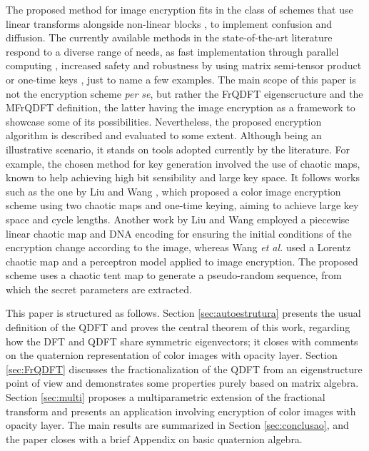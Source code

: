 The proposed method for image encryption fits in the class of schemes that use linear transforms alongside non-linear blocks \cite{hsue2018enhancing}, to implement confusion and diffusion. The currently available methods in the state-of-the-art literature respond to a diverse range of needs, as fast implementation through parallel computing \cite{wang2019fast}, increased safety and robustness by using matrix semi-tensor product \cite{wang2020image} or one-time keys \cite{liu2010}, just to name a few examples. The main scope of this paper is not the encryption scheme \textit{per se}, but rather the FrQDFT eigenscructure and the MFrQDFT definition, the latter having the image encryption as a framework to showcase some of its possibilities. Nevertheless, the proposed encryption algorithm is described and evaluated to some extent. Although being an illustrative scenario, it stands on tools adopted currently by the literature. For example, the chosen method for key generation involved the use of chaotic maps, known to help achieving high bit sensibility and large key space. It follows works such as the one by Liu and Wang \cite{liu2011color}, which proposed a color image encryption scheme using two chaotic maps and one-time keying, aiming to achieve large key space and cycle lengths. Another work by Liu and Wang \cite{liu2012} employed a piecewise linear chaotic map and DNA encoding for ensuring the initial conditions of the encryption change according to the image, whereas Wang \textit{et al.} \cite{wang2010chaotic} used a Lorentz chaotic map and a perceptron model applied to image encryption. The proposed scheme uses a chaotic tent map to generate a pseudo-random sequence, from which the secret parameters are extracted.


This paper is structured as follows. Section \ref{sec:autoestrutura} presents the usual definition of the QDFT and proves the central theorem of this work, regarding how the DFT and QDFT share symmetric eigenvectors; it closes with comments on the quaternion representation of color images with opacity layer. Section \ref{sec:FrQDFT} discusses the fractionalization of the QDFT from an eigenstructure point of view and demonstrates some properties purely based on matrix algebra. Section \ref{sec:multi} proposes a multiparametric extension of the fractional transform and presents an application involving encryption of color images with opacity layer. The main results are summarized in Section \ref{sec:conclusao}, and the paper closes with a brief Appendix on basic quaternion algebra.


